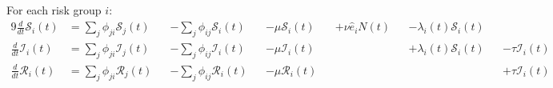 For each risk group $i$:
\begin{alignat}{9}
\frac{d}{dt}\mathcal{S}_i(t) &=
        \sum_j \phi_{ji} \mathcal{S}_j(t)
&&    - \sum_j \phi_{ij} \mathcal{S}_i(t)
&&    - \mu \mathcal{S}_i(t)
&&    + \nu \hat{e}_i N(t)
&&    - \lambda_i(t) \mathcal{S}_i(t)
\\
\frac{d}{dt}\mathcal{I}_i(t) &=
        \sum_j \phi_{ji} \mathcal{I}_j(t)
&&    - \sum_j \phi_{ij} \mathcal{I}_i(t)
&&    - \mu \mathcal{I}_i(t)
&&&&  + \lambda_i(t) \mathcal{S}_i(t)
&&    - \tau \mathcal{I}_i(t)
\\
\frac{d}{dt}\mathcal{R}_i(t) &=
        \sum_j \phi_{ji} \mathcal{R}_j(t)
&&    - \sum_j \phi_{ij} \mathcal{R}_i(t)
&&    - \mu \mathcal{R}_i(t)
&&&&&&+ \tau \mathcal{I}_i(t)
\end{alignat}
